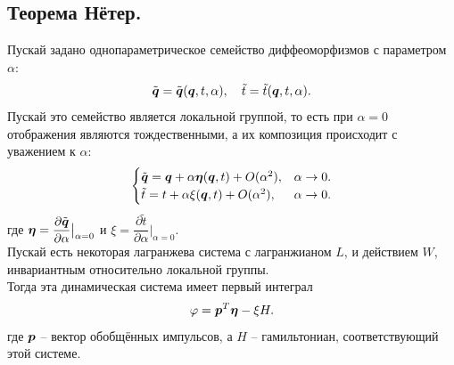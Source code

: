 \subsection{Теорема Нётер.}
\begin{theorem}
        Пускай задано однопараметрическое семейство диффеоморфизмов с параметром $\alpha$:
    \[
        \tilde{\boldsymbol{q}} = \tilde{\boldsymbol{q}}(\boldsymbol{q}, t, \alpha), \quad \tilde{t}= \tilde{t}(\boldsymbol{q}, t, \alpha).
    \]
    Пускай это семейство является локальной группой, то есть при $\alpha = 0$ отображения являются тождественными, а их композиция происходит с уважением к $\alpha$:
    \[
        \begin{cases}
            \tilde{\boldsymbol{q}} = \boldsymbol{q} + \alpha \boldsymbol{\eta}(\boldsymbol{q}, t) + O(\alpha^2), & \alpha \rightarrow 0. \\
            \tilde{t} = t + \alpha \xi(\boldsymbol{q}, t) + O(\alpha^2), & \alpha \rightarrow 0.
        \end{cases}
    \]
    где $\boldsymbol{\eta} = \dfrac{\partial \tilde{\boldsymbol{q}}}{\partial \alpha}\big|_{\alpha = 0}$ и $\xi = \dfrac{\partial \tilde{t}}{\partial \alpha}\big|_{\alpha = 0}$. \\
    Пускай есть некоторая лагранжева система с лагранжианом $L$, и действием $W$, инвариантным относительно локальной группы. \\
    Тогда эта динамическая система имеет первый интеграл
    \[
        \varphi = \boldsymbol{p}^T \boldsymbol{\eta} - \xi H.
    \]
    где $\boldsymbol{p}$ -- вектор обобщённых импульсов, а $H$ -- гамильтониан, соответствующий этой системе.
\end{theorem}
